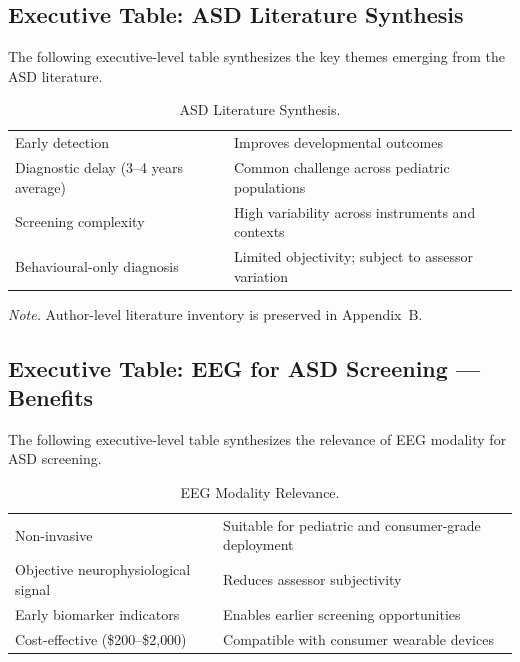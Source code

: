 \subsection{Executive Table: ASD Literature Synthesis}
\label{sec:exec_asd_synthesis}

\noindent The following executive-level table synthesizes the key themes emerging from the ASD literature.

{\tablestripes\tablefontsize
{}
\begin{xltabular}{\textwidth}{@{} >{\raggedright\arraybackslash}p{6cm} L @{}}
\caption[ASD Literature Synthesis]{ASD Literature Synthesis.}\label{tab:exec_asd_synthesis} \\
\toprule
{} &  \\
\midrule
\endfirsthead
\endhead
\bottomrule
\endlastfoot
Early detection & Improves developmental outcomes \\
\addlinespace
Diagnostic delay (3--4 years average) & Common challenge across pediatric populations \\
\addlinespace
Screening complexity & High variability across instruments and contexts \\
\addlinespace
Behavioural-only diagnosis & Limited objectivity; subject to assessor variation \\
\end{xltabular}}
\vspace{0.3em}\noindent\textit{Note.} Author-level literature inventory is preserved in Appendix~B.


\subsection{Executive Table: EEG for ASD Screening --- Benefits}
\label{sec:exec_eeg_synthesis}

\noindent The following executive-level table synthesizes the relevance of EEG modality for ASD screening.

{\tablestripes\tablefontsize
{}
\begin{xltabular}{\textwidth}{@{} >{\raggedright\arraybackslash}p{6cm} L @{}}
\caption[EEG Modality Relevance]{EEG Modality Relevance.}\label{tab:exec_eeg_synthesis} \\
\toprule
{} &  \\
\midrule
\endfirsthead
\endhead
\bottomrule
\endlastfoot
Non-invasive & Suitable for pediatric and consumer-grade deployment \\
\addlinespace
Objective neurophysiological signal & Reduces assessor subjectivity \\
\addlinespace
Early biomarker indicators & Enables earlier screening opportunities \\
\addlinespace
Cost-effective (\$200--\$2{,}000) & Compatible with consumer wearable devices \\
\end{xltabular}}


